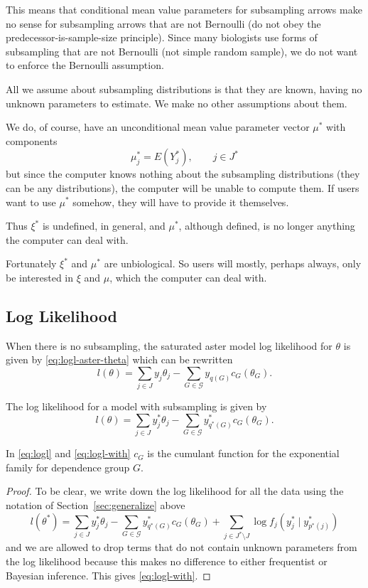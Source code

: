 This means that conditional mean value parameters
for subsampling arrows make no sense for subsampling arrows that are not
Bernoulli (do not obey the predecessor-is-sample-size principle).
Since many biologists use forms of subsampling that are not Bernoulli
(not simple random sample), we do not want to enforce the Bernoulli
assumption.

All we assume about subsampling distributions is that they are known,
having no unknown parameters to estimate.
We make no other assumptions about them.

We do, of course, have an unconditional mean value parameter vector $\mu^*$
with components
\begin{equation} \label{eq:mu-star}
   \mu^*_j = E(Y^*_j), \qquad j \in J^*
\end{equation}
but since the computer knows nothing about the subsampling distributions
(they can be any distributions), the computer will be unable to compute
them.  If users want to use $\mu^*$ somehow, they will have to provide
it themselves.

Thus $\xi^*$ is undefined, in general, and $\mu^*$, although defined,
is no longer anything the computer can deal with.

Fortunately $\xi^*$ and $\mu^*$ are unbiological.  So users will mostly,
perhaps always, only be interested in $\xi$ and $\mu$, which the computer
can deal with.

\subsection{Log Likelihood}
\label{sec:logl}

When there is no subsampling, the saturated aster model log likelihood
for $\theta$ is given by \eqref{eq:logl-aster-theta} which can be rewritten
\begin{equation} \label{eq:logl}
   l(\theta)
   =
   \sum_{j \in J} y_j \theta_j
   - \sum_{G \in \mathcal{G}} y_{q(G)} c_G(\theta_G).
\end{equation}

\begin{theorem} \label{th:logl-theta}
The log likelihood for a model with subsampling is given by
\begin{equation} \label{eq:logl-with}
   l(\theta)
   =
   \sum_{j \in J} y^*_j \theta_j
   - \sum_{G \in \mathcal{G}} y^*_{q^*(G)} c_G(\theta_G).
\end{equation}
\end{theorem}
In \eqref{eq:logl} and \eqref{eq:logl-with}
$c_G$ is the cumulant function for the exponential family
for dependence group $G$.
\begin{proof}
To be clear, we write down the log likelihood for all the data
using the notation of Section~\ref{sec:generalize} above
$$
   l(\theta^*)
   =
   \sum_{j \in J} y_j^* \theta_j
   - \sum_{G \in \mathcal{G}} y_{q^*(G)}^* c_G(\theta_G)
   +
   \sum_{j \in J^* \setminus J} \log f_j(y_j^* \mid y_{p^*(j)}^*)
$$
and we are allowed to drop terms that do not contain unknown parameters from the
log likelihood because this makes no difference to either frequentist or
Bayesian inference.  This gives \eqref{eq:logl-with}.
\end{proof}

